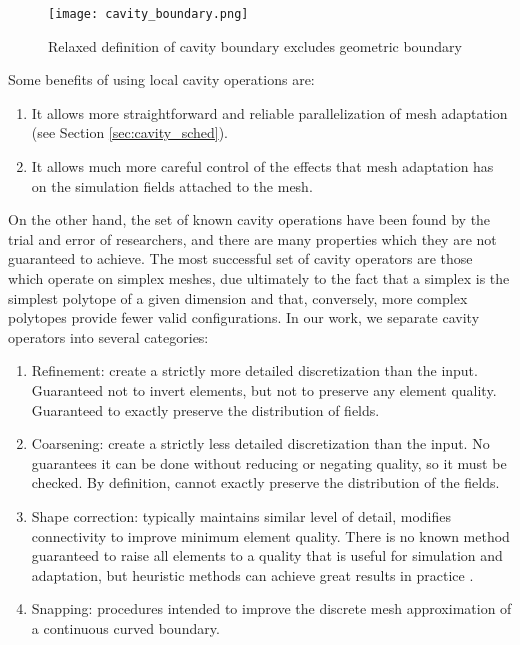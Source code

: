 \begin{figure}
\begin{center}
\texttt{[image: cavity\_boundary.png]}
\caption{Relaxed definition of cavity boundary excludes geometric boundary}
\label{fig:cavity_boundary}
\end{center}
\end{figure}

Some benefits of using local cavity operations are:
\begin{enumerate}
\item It allows more straightforward and reliable parallelization of
mesh adaptation (see Section \ref{sec:cavity_sched}).
\item It allows much more careful control of the effects that mesh
adaptation has on the simulation fields attached to the mesh.
\end{enumerate}

On the other hand, the set of known cavity operations
have been found by the trial and error of researchers,
and there are many properties which they are not guaranteed to
achieve.
The most successful set of cavity operators are those
which operate on simplex meshes, due ultimately to the
fact that a simplex is the simplest polytope of a given dimension
and that, conversely, more complex polytopes provide fewer
valid configurations.
In our work, we separate cavity operators into several categories:
\begin{enumerate}
\item Refinement: create a strictly more detailed discretization
than the input. Guaranteed not to invert elements, but not to
preserve any element quality. Guaranteed to exactly preserve
the distribution of fields.
\item Coarsening: create a strictly less detailed discretization
than the input. No guarantees it can be done without reducing
or negating quality, so it must be checked.
By definition, cannot exactly preserve the distribution of the fields.
\item Shape correction: typically maintains similar level of detail,
modifies connectivity to improve minimum element quality.
There is no known method guaranteed to raise all elements to a quality
that is useful for simulation and adaptation, but heuristic
methods can achieve great results in practice \cite{klingner2008aggressive}.
\item Snapping: procedures intended to improve the discrete
mesh approximation of a continuous curved boundary.
\end{enumerate}

